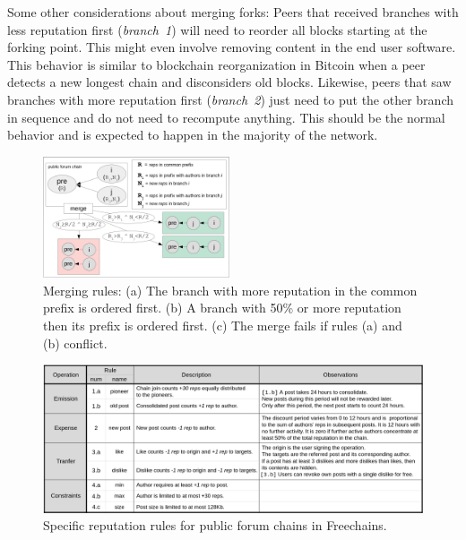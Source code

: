 \documentclass[10pt,journal,compsoc]{IEEEtran}
\newcommand{\FC}       {Freechains\xspace}
\begin{document}
Some other considerations about merging forks:
Peers that received branches with less reputation first (\emph{branch~1}) will
need to reorder all blocks starting at the forking point.
This might even involve removing content in the end user software.
This behavior is similar to blockchain reorganization in Bitcoin when a peer
detects a new longest chain and disconsiders old blocks.
%
Likewise, peers that saw branches with more reputation first (\emph{branch~2})
just need to put the other branch in sequence and do not need to recompute
anything.
This should be the normal behavior and is expected to happen in the majority of
the network.

\begin{figure}
\centering
\includegraphics[width=0.49\textwidth]{merge.png}
\caption{
    Merging rules:
    (a) The branch with more reputation in the common prefix is ordered first.
    (b) A branch with 50\% or more reputation then its prefix is ordered first.
    (c) The merge fails if rules (a) and (b) conflict.
}
\label{fig.merge}
\end{figure}

\begin{figure}
\centering
\includegraphics[width=\textwidth]{rules.png}
\caption{Specific reputation rules for public forum chains in \FC.}
\label{fig.rules}
\end{figure}
\end{document}
